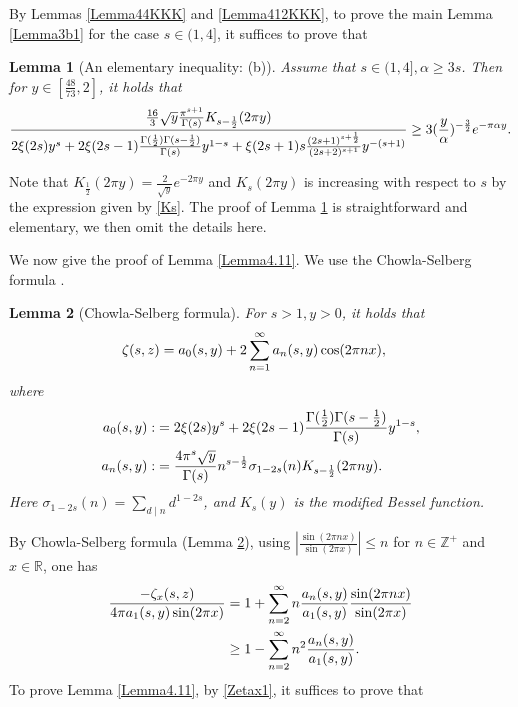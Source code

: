 \documentclass[reqno,english]{amsart}
\newtheorem{lemma}{Lemma}[section]
\newtheorem{open problem}{Open Problem}[section]
\newtheorem{open question}{Open Question}[section]
\newtheorem{open questions on hexagonal lattice}{Open Questions on hexagonal lattice}[section]
\newcommand{\R}{{\mathbb R}}
\begin{document}
By Lemmas \ref{Lemma44KKK} and \ref{Lemma412KKK}, to prove the main Lemma \ref{Lemma3b1} for the case $s\in(1,4]$, it suffices to prove that
\begin{lemma}[An elementary inequality: (b)]\label{Lemma4.13} Assume that $s\in(1,4], \alpha\geq3s$. Then for $y\in[\frac{48}{73},2]$, it holds that
 \begin{equation}\aligned\nonumber
\frac{\frac{16}{3}\sqrt{y}\frac{\pi^{s+1}}{\Gamma(s)}K_{s-\frac{1}{2}}(2\pi y)}
{2\xi(2s)y^s+
2\xi(2s-1)\frac{\Gamma(\frac{1}{2})\Gamma(s-\frac{1}{2})}{\Gamma(s)}y^{1-s}
+\xi(2s+1)s\frac{(2s+1)^{s+\frac{1}{2}}}{(2s+2)^{s+1}}y^{-(s+1)}}\geq
3(\frac{y}{\alpha})^{-\frac{3}{2}}e^{-\pi\alpha y}.
\endaligned\end{equation}

\end{lemma}
Note that $K_{\frac{1}{2}}(2\pi y)=\frac{2}{\sqrt y}e^{-2\pi y}$ and $K_s(2\pi y)$ is increasing with respect to $s$ by the expression
given by \eqref{Ks}. The proof of Lemma \ref{Lemma4.13} is straightforward and elementary, we then omit the details here.





We now give the proof of Lemma \ref{Lemma4.11}. We use the Chowla-Selberg formula \cite{Chowla1949,Chowla1967}.

\begin{lemma}[Chowla-Selberg formula]\label{Lemma4.14} For $s>1, y>0$, it holds that
 \begin{equation}\aligned\nonumber
\zeta(s,z)&=a_0(s,y)+2\sum_{n=1}^\infty a_n(s,y)\cos(2\pi nx),
\endaligned\end{equation}
where
 \begin{equation}\aligned\label{Aa0}
a_0(s,y):&=2\xi(2s)y^s+
2\xi(2s-1)\frac{\Gamma(\frac{1}{2})\Gamma(s-\frac{1}{2})}{\Gamma(s)}y^{1-s},\\
a_n(s,y):&=\frac{4\pi^s\sqrt{y}}{\Gamma(s)}n^{s-\frac{1}{2}}\sigma_{1-2s}(n)K_{s-\frac{1}{2}}(2\pi ny).
\endaligned\end{equation}
Here $\sigma_{1-2s}(n)=\sum_{d\mid n} d^{1-2s}$, and $K_s(y)$ is the modified Bessel function.


\end{lemma}

By Chowla-Selberg formula (Lemma \ref{Lemma4.14}), using $|\frac{\sin(2\pi nx)}{\sin(2\pi x)}|\leq n$ for $n\in \mathbb{Z}^+$ and $x\in\R$, one has
 \begin{equation}\aligned\label{Zetax1}
\frac{-\zeta_x(s,z)}{4\pi a_1(s,y)\sin(2\pi x)}&=1+\sum_{n=2}^\infty n\frac{a_n(s,y)}{a_1(s,y)}\frac{\sin(2\pi nx)}{\sin(2\pi x)}\\
&\geq1-\sum_{n=2}^\infty n^2\frac{a_n(s,y)}{a_1(s,y)}.
\endaligned\end{equation}
To prove Lemma \ref{Lemma4.11}, by \eqref{Zetax1}, it suffices to prove that
\end{document}
